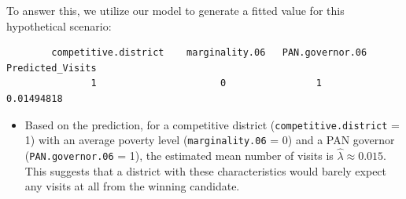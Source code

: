 \documentclass[12pt,letterpaper]{article}
\begin{document}
\begin{enumerate}
	\vspace{0.2cm}
	
	To answer this, we utilize our model to generate a fitted value for this hypothetical scenario:
	
	\vspace{0.2cm}
	
	 
	
	\begin{verbatim}
		competitive.district    marginality.06   PAN.governor.06      Predicted_Visits
		       1                      0                1                 0.01494818
	\end{verbatim}
	
	\begin{itemize}
		\setlength{\itemsep}{0.2cm}
		\item Based on the prediction, for a competitive district (\texttt{competitive.district} = 1) with an average poverty level (\texttt{marginality.06} = 0) and a PAN governor (\texttt{PAN.governor.06} = 1), the estimated mean number of visits is $\hat{\lambda} \approx 0.015$. This suggests that a district with these characteristics would barely expect any visits at all from the winning candidate.
	\end{itemize}
	
\end{enumerate}
\end{document}
